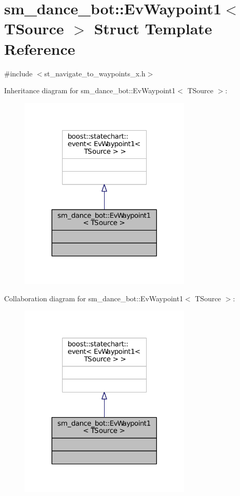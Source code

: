 \hypertarget{structsm__dance__bot_1_1EvWaypoint1}{}\section{sm\+\_\+dance\+\_\+bot\+:\+:Ev\+Waypoint1$<$ T\+Source $>$ Struct Template Reference}
\label{structsm__dance__bot_1_1EvWaypoint1}


{\ttfamily \#include $<$st\+\_\+navigate\+\_\+to\+\_\+waypoints\+\_\+x.\+h$>$}



Inheritance diagram for sm\+\_\+dance\+\_\+bot\+:\+:Ev\+Waypoint1$<$ T\+Source $>$\+:
\nopagebreak
\begin{figure}[H]
\begin{center}
\leavevmode
\includegraphics[width=233pt]{structsm__dance__bot_1_1EvWaypoint1__inherit__graph}
\end{center}
\end{figure}


Collaboration diagram for sm\+\_\+dance\+\_\+bot\+:\+:Ev\+Waypoint1$<$ T\+Source $>$\+:
\nopagebreak
\begin{figure}[H]
\begin{center}
\leavevmode
\includegraphics[width=233pt]{structsm__dance__bot_1_1EvWaypoint1__coll__graph}
\end{center}
\end{figure}


